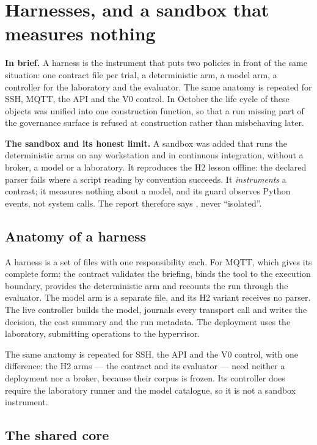 \section{Harnesses, and a sandbox that measures nothing}
\label{sec:harnais-sandbox}

\textbf{In brief.} A harness is the instrument that puts two policies in front of
the same situation: one contract file per trial, a deterministic arm, a model arm,
a controller for the laboratory and the evaluator. The same anatomy is repeated
for SSH, MQTT, the API and the V0 control. In October the life cycle of these
objects was unified into one construction function, so that a run missing part of
the governance surface is refused at construction rather than misbehaving later.

\textbf{The sandbox and its honest limit.} A sandbox was added that runs the
deterministic arms on any workstation and in continuous integration, without a
broker, a model or a laboratory. It reproduces the H2 lesson offline: the declared
parser fails where a script reading by convention succeeds. It \emph{instruments}
a contrast; it measures nothing about a model, and its guard observes Python events,
not system calls. The report therefore says , never
``isolated''.

\subsection{Anatomy of a harness}

A harness is a set of files with one responsibility each. For MQTT, which gives
its complete form: the contract validates the briefing, binds the tool to the
execution boundary, provides the deterministic arm and recounts the run through the
evaluator. The model arm is a separate file, and its H2 variant receives no parser.
The live controller builds the model, journals every transport call and writes the
decision, the cost summary and the run metadata. The deployment uses the
laboratory, submitting operations to the hypervisor.

The same anatomy is repeated for SSH, the API and the V0 control, with one
difference: the H2 arms --- the contract and its evaluator --- need neither a
deployment nor a broker, because their corpus is frozen. Its controller
 does require the laboratory runner and the model
catalogue, so it is not a sandbox instrument.

\subsection{The shared core}

